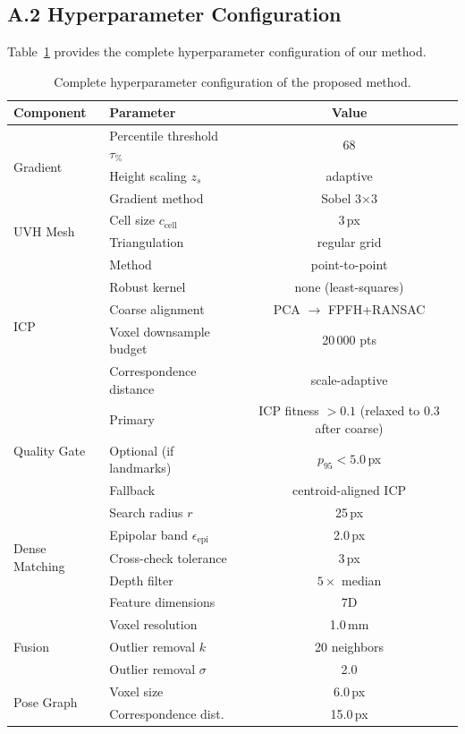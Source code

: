 \documentclass[review]{elsarticle}
\begin{document}
\subsection*{A.2 Hyperparameter Configuration}

Table~\ref{tab:supp_hyperparams} provides the complete hyperparameter configuration of our method.

\begin{table}[h]
\centering
\caption{Complete hyperparameter configuration of the proposed method.}
\label{tab:supp_hyperparams}
\setlength{\tabcolsep}{3pt}
\renewcommand{\arraystretch}{1.05}
\begin{tabular}{llc}
\toprule
Component & Parameter & Value \\
\midrule
\multirow{3}{*}{Gradient} & Percentile threshold $\tau_{\%}$ & 68 \\
 & Height scaling $z_s$ & adaptive \\
 & Gradient method & Sobel 3$\times$3 \\
\midrule
\multirow{2}{*}{UVH Mesh} & Cell size $c_{\mathrm{cell}}$ & 3\,px \\
 & Triangulation & regular grid \\
\midrule
\multirow{5}{*}{ICP} & Method & point-to-point \\
 & Robust kernel & none (least-squares) \\
 & Coarse alignment & PCA $\to$ FPFH+RANSAC \\
 & Voxel downsample budget & 20\,000 pts \\
 & Correspondence distance & scale-adaptive \\
\midrule
\multirow{3}{*}{Quality Gate} & Primary & ICP fitness $> 0.1$ (relaxed to 0.3 after coarse) \\
 & Optional (if landmarks) & $p_{95} < 5.0$\,px \\
 & Fallback & centroid-aligned ICP \\
\midrule
\multirow{5}{*}{Dense Matching} & Search radius $r$ & 25\,px \\
 & Epipolar band $\epsilon_{\mathrm{epi}}$ & 2.0\,px \\
 & Cross-check tolerance & 3\,px \\
 & Depth filter & $5\times$ median \\
 & Feature dimensions & 7D \\
\midrule
\multirow{3}{*}{Fusion} & Voxel resolution & 1.0\,mm \\
 & Outlier removal $k$ & 20 neighbors \\
 & Outlier removal $\sigma$ & 2.0 \\
\midrule
\multirow{2}{*}{Pose Graph} & Voxel size & 6.0\,px \\
 & Correspondence dist. & 15.0\,px \\
\bottomrule
\end{tabular}
\end{table}
\end{document}
